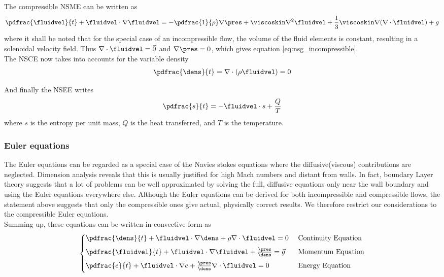 \documentclass[../main.tex]{subfiles}
\begin{document}
The compressible \ac{NSME} can be written as
\begin{align}\label{eq:nsg_compressible}
\pdfrac{\fluidvel}{t} +
\fluidvel\cdot\nabla\fluidvel =
-\pdfrac{1}{\rho}\nabla\pres +
\viscoskin\nabla^2\fluidvel +
\frac{1}{3} \viscoskin\nabla(\nabla\cdot\fluidvel) +
g
\end{align}
where it shall be noted that for the special case of an incompressible flow, the volume of the fluid elements is constant, resulting in a solenoidal velocity field. Thus $\nabla\cdot\fluidvel=\vec{0}$ and $\nabla\pres=0$, which gives equation \ref{eq:nsg_incompressible}.
\\
The \ac{NSCE} now takes into accounts for the variable density
\begin{align}
\pdfrac{\dens}{t}=\nabla\cdot(\rho\fluidvel)=0
\end{align}

And finally the \ac{NSEE} writes
\begin{align}
\pdfrac{s}{t}=-\fluidvel\cdot s + \frac{Q}{T}
\end{align}
where $s$ is the entropy per unit mass, $Q$ is the heat transferred, and $T$ is the temperature.


\subsubsection{Euler equations}\label{sec:euler_convective}
The Euler equations can be regarded as a special case of the Navies stokes equations where the diffusive(viscous) contributions are neglected. Dimension analysis \cite{Doering1995} reveals that this is usually justified for high Mach numbers and distant from walls. In fact, boundary Layer theory suggests that a lot of problems can be well approximated by solving the full, diffusive equations only near the wall boundary and using the Euler equations everywhere else.
Although the Euler equations can be derived for both incompressible and compressible flows, the statement above suggests that only the compressible ones give actual, physically correct results. We therefore restrict our considerations to the compressible Euler equations.\\
Summing up, these equations can be written in convective form as
\begin{align}
\begin{cases}
\pdfrac{\dens}{t}+\fluidvel\cdot\nabla\dens+\rho\nabla\cdot\fluidvel = 0           &\text{ Continuity Equation} \\[0.5em]
\pdfrac{\fluidvel}{t}+\fluidvel\cdot\nabla\fluidvel+\frac{\pres}{\dens} = \vec{g}  &\text{ Momentum Equation} \\[0.5em]
\pdfrac{e}{t}+\fluidvel\cdot\nabla e + \frac{\pres}{\dens}\nabla\cdot\fluidvel = 0 &\text{ Energy Equation} \\[0.5em]
\end{cases}
\end{align}
\end{document}
